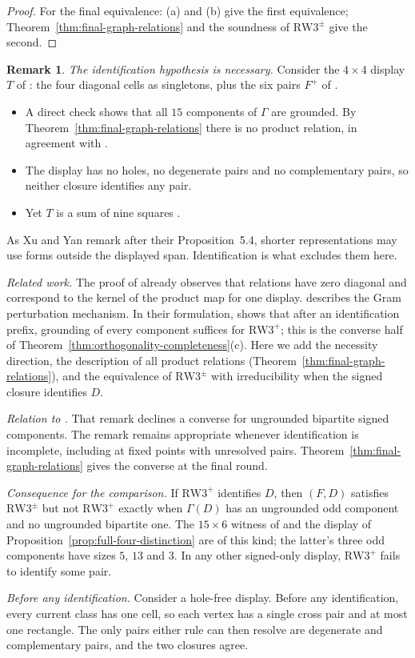 \documentclass[11pt,a4paper]{article}
\theoremstyle{definition}
\newtheorem{remark}[theorem]{Remark}
\newcommand{\RW}{\mathrm{RW3}^{+}}
\newcommand{\SG}{\mathrm{RW3}^{\pm}}
\begin{document}
\begin{proof}
For the final equivalence: (a) and (b) give the first equivalence;
Theorem~\ref{thm:final-graph-relations} and the soundness of $\SG$
\cite[Theorem~7.2]{LQ} give the second.
\end{proof}

\begin{remark}\label{rem:final-graph}
\emph{The identification hypothesis is necessary.} Consider the
$4\times4$ display $T$ of \cite[(40)]{XY}: the four diagonal cells as
singletons, plus the six pairs $F^+$ of \cite[(38)]{XY}.
\begin{itemize}
\item A direct check shows that all $15$ components of $\Gamma$ are
      grounded. By Theorem~\ref{thm:final-graph-relations} there is no
      product relation, in agreement with \cite[Proposition~5.4]{XY}.
\item The display has no holes, no degenerate pairs and no complementary
      pairs, so neither closure identifies any pair.
\item Yet $T$ is a sum of nine squares \cite[Theorem~5.3]{XY}.
\end{itemize}
As Xu and Yan remark after their Proposition~5.4, shorter representations
may use forms outside the displayed span. Identification is what excludes
them here.

\emph{Related work.} The proof of \cite[Proposition~5.4]{XY} already
observes that relations have zero diagonal and correspond to the kernel of
the product map for one display. \cite[Remark~7.8]{LQ} describes the Gram
perturbation mechanism. In their formulation,
\cite[Proposition~2.3]{CLQIncidence} shows that after an identification
prefix, grounding of every component suffices for $\RW$; this is the
converse half of Theorem~\ref{thm:orthogonality-completeness}(c).
Here we add the necessity direction, the description of all product
relations (Theorem~\ref{thm:final-graph-relations}), and the equivalence
of $\SG$ with irreducibility when the signed closure identifies $D$.

\emph{Relation to \cite[Remark~7.8]{LQ}.} That remark declines a converse
for ungrounded bipartite signed components. The remark remains appropriate
whenever identification is incomplete, including at fixed points with
unresolved pairs. Theorem~\ref{thm:final-graph-relations} gives the
converse at the final round.

\emph{Consequence for the comparison.} If $\RW$ identifies $D$, then
$(F,D)$ satisfies $\SG$ but not $\RW$ exactly when $\Gamma(D)$ has an
ungrounded odd component and no ungrounded bipartite one. The $15\times6$
witness of \cite[Theorem~7.5]{LQ} and the display of
Proposition~\ref{prop:full-four-distinction} are of this kind; the latter's
three odd components have sizes $5$, $13$ and $3$. In any other
signed-only display, $\RW$ fails to identify some pair.

\emph{Before any identification.} Consider a hole-free display. Before
any identification, every current class has one cell, so each vertex has a single
cross pair and at most one rectangle. The only pairs either rule can then
resolve are degenerate and complementary pairs, and the two closures agree.

\end{remark}
\end{document}
